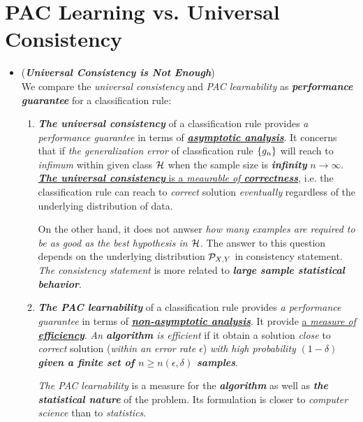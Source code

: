 \documentclass[11pt]{article}
\begin{document}
\section{PAC Learning vs. Universal Consistency}
\begin{itemize}
\item \begin{remark} (\emph{\textbf{Universal Consistency is Not Enough}}) \citep{shalev2014understanding}\\
We compare the \emph{universal consistency} and \emph{PAC learnability} as \emph{\textbf{performance guarantee}} for a classification rule:
\begin{enumerate}
\item \emph{\textbf{The universal consistency}} of a classification rule provides \emph{a performance guarantee} in terms of \underline{\emph{\textbf{asymptotic analysis}}}. It concerns that if \emph{the generalization error} of classfication rule $\left\{g_n\right\}$ will reach to \emph{infimum} within given class ${\mathcal H}$ when the sample size is \emph{\textbf{infinity}} $n \to \infty$.  \underline{\emph{\textbf{The universal consistency}} is a \emph{meaurable of \textbf{correctness}}}, i.e. the classification rule can reach to \emph{correct} solution \emph{eventually} regardless of the underlying distribution of data.

On the other hand, it does not anwser \emph{how many examples are required to be as good as the best hypothesis in ${\mathcal H}$}. The answer to this question depends on the underlying distribution ${\mathcal P}_{X,Y}$ in consistency statement.  %
\emph{The consistency statement} is more related to \emph{\textbf{large sample statistical behavior}}.

\item \emph{\textbf{The PAC learnability}} of a classification rule provides \emph{a performance guarantee} in terms of \underline{\emph{\textbf{non-asymptotic analysis}}}. It provide \underline{a \emph{measure of \textbf{efficiency}}}. \emph{An \textbf{algorithm} is efficient} if it obtain a solution \emph{close} to \emph{correct} solution (\emph{within an error rate $\epsilon$}) \emph{with high probability} $(1 - \delta)$ \emph{\textbf{given a finite set  of $n \ge n(\epsilon, \delta)$ samples}}. 

\emph{The PAC learnability} is a measure for the \emph{\textbf{algorithm}} as well as \emph{\textbf{the statistical nature}} of the problem. Its formulation is closer to \emph{computer science} than to \emph{statistics}. 


\end{enumerate}
\end{remark}
\end{itemize}
\end{document}
